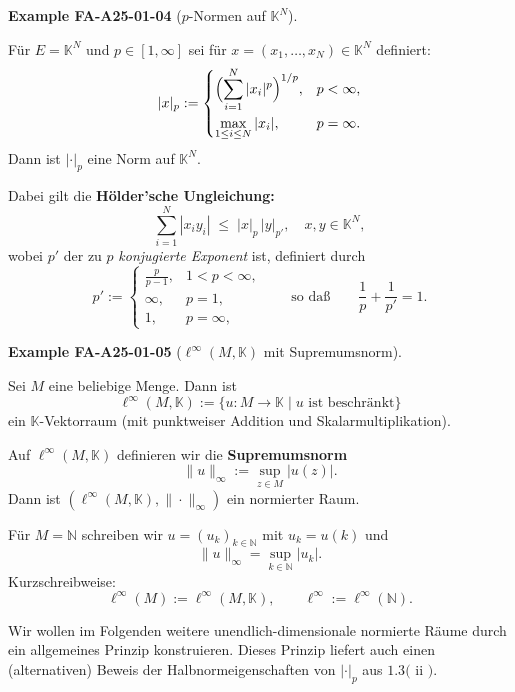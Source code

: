 \documentclass[10pt, letterpaper]{article}
\newcommand{\CustomHeading}[3]{%
  \par\medskip\noindent%
  \textbf{#1 #2} \textnormal{(#3)}.\enskip%
}
\newenvironment{EXA}[2]{\begin{unitbox}\CustomHeading{Example}{#1}{#2}}{\end{unitbox}}
\begin{document}
\begin{EXA}{FA-A25-01-04}{$p$-Normen auf $\mathbb{K}^N$}
Für $E=\mathbb{K}^N$ und $p\in[1,\infty]$ sei für $x=(x_1,\dots,x_N)\in\mathbb{K}^N$ definiert:
\[
|x|_p :=
\begin{cases}
\displaystyle \Bigl(\sum_{i=1}^N |x_i|^p\Bigr)^{1/p}, & p<\infty,\\[1em]
\displaystyle \max_{1\le i\le N} |x_i|, & p=\infty.
\end{cases}
\]
Dann ist $|\cdot|_p$ eine Norm auf $\mathbb{K}^N$.

\smallskip
Dabei gilt die \textbf{Hölder’sche Ungleichung:}
\[
\sum_{i=1}^N |x_i y_i|
\;\le\;
|x|_p\,|y|_{p'},
\quad
x,y\in\mathbb{K}^N,
\]
wobei $p'$ der zu $p$ \emph{konjugierte Exponent} ist, definiert durch
\[
p' :=
\begin{cases}
\frac{p}{p-1}, & 1<p<\infty,\\
\infty, & p=1,\\
1, & p=\infty,
\end{cases}
\qquad\text{so daß}\qquad
\frac{1}{p}+\frac{1}{p'}=1.
\]
\end{EXA}




\begin{EXA}{FA-A25-01-05}{$\ell^\infty(M,\mathbb{K})$ mit Supremumsnorm}
Sei $M$ eine beliebige Menge.  
Dann ist
\[
\ell^{\infty}(M,\mathbb{K})
:=\bigl\{u:M\to\mathbb{K}\mid u\text{ ist beschränkt}\bigr\}
\]
ein $\mathbb{K}$-Vektorraum (mit punktweiser Addition und Skalarmultiplikation).

Auf $\ell^{\infty}(M,\mathbb{K})$ definieren wir die \textbf{Supremumsnorm}
\[
\|u\|_{\infty} := \sup_{z\in M}|u(z)|.
\]
Dann ist $(\ell^{\infty}(M,\mathbb{K}),\|\cdot\|_\infty)$ ein normierter Raum.

\smallskip
Für $M=\mathbb{N}$ schreiben wir $u=(u_k)_{k\in\mathbb{N}}$ mit $u_k=u(k)$ und
\[
\|u\|_{\infty} = \sup_{k\in\mathbb{N}}|u_k|.
\]
Kurzschreibweise:
\[
\ell^{\infty}(M):=\ell^{\infty}(M,\mathbb{K}),
\qquad
\ell^{\infty}:=\ell^{\infty}(\mathbb{N}).
\]
\end{EXA}






Wir wollen im Folgenden weitere unendlich-dimensionale normierte Räume durch ein allgemeines Prinzip konstruieren. Dieses Prinzip liefert auch einen (alternativen) Beweis der Halbnormeigenschaften von $|\cdot|_{p}$ aus $1.3($ ii $)$.
\end{document}
